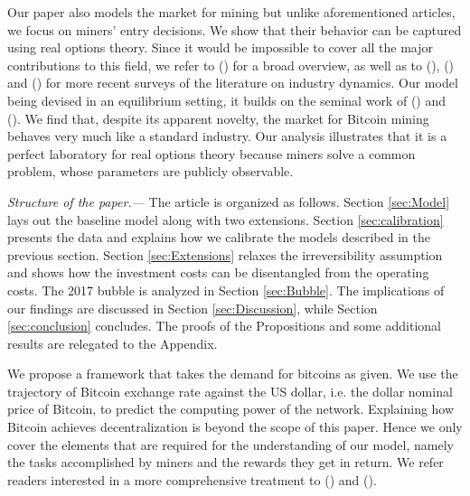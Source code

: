 \documentclass[12pt, a4paper]{article}
\makeatletter
\renewcommand{\section}{\@startsection{section}{2}{0mm}{-0.8\baselineskip}{.5\baselineskip}{\normalfont\large\bfseries}}
\makeatother
\begin{document}
Our paper also models the market for mining but unlike aforementioned
articles, we focus on miners' entry decisions. We show that their behavior
can be captured using real options theory.
Since it would be impossible to cover all the major contributions to this
field, we refer to \citeauthor{DixitPyndick} (\citeyear{DixitPyndick}) for a broad overview,
as well as to \citeauthor{Thomas} (\citeyear{Thomas}), \citeauthor{Caplin} (\citeyear{Caplin}) and
\citeauthor{Bachmann} (\citeyear{Bachmann}) for more recent surveys of the literature
on industry dynamics. Our model being devised in an
equilibrium setting, it builds on the seminal work of %
\citeauthor{BertolaCaballero} (\citeyear{BertolaCaballero}) and %
\citeauthor{CaballeroPyndick} (\citeyear{CaballeroPyndick}).
We find that, despite its apparent novelty, the market for Bitcoin
mining behaves very much like a standard industry. Our analysis
illustrates that it is a perfect laboratory for real options theory because
miners solve a common problem, whose parameters are publicly observable.

\emph{Structure of the paper.---} The article is organized as follows.
Section \ref{sec:Model} lays out the baseline model along with two extensions.
Section \ref{sec:calibration} presents the data and explains how we calibrate the models
described in the previous section. Section \ref{sec:Extensions} relaxes the irreversibility assumption and shows
how the investment costs can be disentangled from the operating costs.
The 2017 bubble is analyzed in Section \ref{sec:Bubble}. The implications of our findings are discussed in
Section \ref{sec:Discussion}, while Section \ref{sec:conclusion} concludes. The
proofs of the Propositions and some additional results are relegated to the
Appendix.

\section{Equilibrium Models}

\label{sec:Model}

We propose a framework that takes the demand
for bitcoins as given. We use the trajectory of Bitcoin exchange rate
against the US dollar, i.e. the dollar nominal price of Bitcoin, to
predict the computing power of the network. Explaining
how Bitcoin achieves decentralization is beyond the scope of this paper. Hence we only cover the elements that are
required for the understanding of our model, namely the tasks accomplished by miners and the rewards they
get in return. We refer readers interested in
a more comprehensive treatment to \citeauthor{Satoshi} (\citeyear{Satoshi})
and \citeauthor{MasteringBitcoin} (\citeyear{MasteringBitcoin}).
\end{document}
